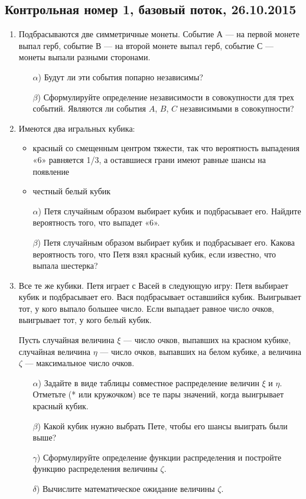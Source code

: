 \subsection{Контрольная номер 1, базовый поток, 26.10.2015}

\begin{enumerate}
\item
Подбрасываются две симметричные монеты. Событие А — на первой монете выпал
герб, событие В — на второй монете выпал герб, событие С — монеты выпали
разными сторонами.
\begin{enumerate}
    \item[$\alpha$)] Будут ли эти события попарно независимы?
    \item[$\beta$)]  Сформулируйте определение независимости в совокупности для трех событий. Являются ли события $A$, $B$, $C$ независимыми в совокупности?
\end{enumerate}

\item
Имеются два игральных кубика:
\begin{itemize}
    \item красный со смещенным центром тяжести, так что вероятность выпадения «6»
    равняется 1/3, а оставшиеся грани имеют равные шансы на появление
    \item честный белый кубик
\end{itemize}

\begin{enumerate}
    \item[$\alpha$)] Петя случайным образом выбирает кубик и подбрасывает его. Найдите
    вероятность того, что выпадет «6».
    \item[$\beta$)]   Петя случайным образом выбирает кубик и подбрасывает его. Какова
    вероятность того, что Петя взял красный кубик, если известно, что выпала
    шестерка?
\end{enumerate}

\item
Все те же кубики. Петя играет с Васей в следующую игру: Петя выбирает кубик и
подбрасывает его. Вася подбрасывает оставшийся кубик. Выигрывает тот, у кого
выпало большее число. Если выпадает равное число очков, выигрывает тот, у кого
белый кубик.

Пусть случайная величина $\xi$ — число очков, выпавших на красном кубике, случайная величина $\eta$ — число очков,
выпавших на белом кубике, а величина $\zeta$ — максимальное число очков.

\begin{enumerate}
    \item[$\alpha$)] Задайте в виде таблицы совместное распределение величин $\xi$ и $\eta$. Отметьте (* или кружочком) все те пары значений, когда выигрывает красный кубик.
    \item[$\beta$)] Какой кубик нужно выбрать Пете, чтобы его шансы выиграть были выше?
    \item[$\gamma$)] Сформулируйте определение функции распределения и постройте функцию
    распределения величины $\zeta$.
    \item[$\delta$)] Вычислите математическое ожидание величины $\zeta$.
\end{enumerate}


\end{enumerate}
